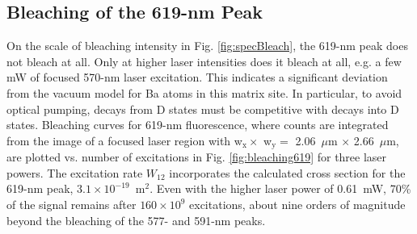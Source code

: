 
\subsection{Bleaching of the 619-nm Peak}


On the scale of bleaching intensity in Fig. \ref{fig:specBleach}, the 619-nm peak does not bleach at all.  Only at higher laser intensities does it bleach at all, e.g. a few mW of focused 570-nm laser excitation.  This indicates a significant deviation from the vacuum model for Ba atoms in this matrix site.  In particular, to avoid optical pumping, decays from D states must be competitive with decays into D states.  Bleaching curves for 619-nm fluorescence, where counts are integrated from the image of a focused laser region with w$_{\text{x}} \times$ w$_{\text{y}} =$ 2.06~$\mu$m $\times$ 2.66~$\mu$m, are plotted vs. number of excitations in Fig. \ref{fig:bleaching619} for three laser powers.  The excitation rate $W_{12}$ incorporates the calculated cross section for the 619-nm peak, $3.1 \times 10^{-19}$~m$^{2}$.  Even with the higher laser power of 0.61~mW, 70\% of the signal remains after $160 \times 10^{9}$ excitations, about nine orders of magnitude beyond the bleaching of the 577- and 591-nm peaks.


